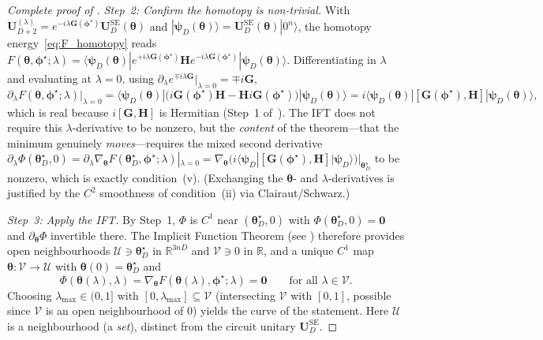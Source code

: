 \documentclass[11pt]{article}
\newcommand{\cU}{\mathcal{U}}
\newcommand{\cV}{\mathcal{V}}
\newcommand{\bbR}{\mathbb{R}}
\theoremstyle{plain}
\theoremstyle{plain}
\begin{document}
\begin{proof}[Complete proof of ]
\emph{Step~2: Confirm the homotopy is non-trivial.}
With $\mathbf{U}_{D+2}^{(\lambda)}=e^{-i\lambda\mathbf{G}(\bm\phi^\star)}
\mathbf{U}_D^{\mathrm{SE}}(\bm\theta)$ and
$|\boldsymbol{\psi}_D(\bm\theta)\rangle=\mathbf{U}_D^{\mathrm{SE}}(\bm\theta)|0^n\rangle$,
the homotopy energy~\eqref{eq:F_homotopy} reads
$F(\bm\theta,\bm\phi^\star;\lambda)
=\langle\boldsymbol{\psi}_D(\bm\theta)| 
e^{+i\lambda\mathbf{G}(\bm\phi^\star)}\mathbf{H} e^{-i\lambda\mathbf{G}(\bm\phi^\star)} 
|\boldsymbol{\psi}_D(\bm\theta)\rangle$.
Differentiating in $\lambda$ and evaluating at $\lambda=0$, using
$\partial_\lambda e^{\mp i\lambda\mathbf{G}}|_{\lambda=0}=\mp i\mathbf{G}$,
\begin{equation}\label{eq:lambda_deriv_app}
  \partial_\lambda F(\bm\theta,\bm\phi^\star;\lambda)\big|_{\lambda=0}
  =\langle\boldsymbol{\psi}_D(\bm\theta)|
    \bigl(i\mathbf{G}(\bm\phi^\star)\mathbf{H}-\mathbf{H} i\mathbf{G}(\bm\phi^\star)\bigr)
    |\boldsymbol{\psi}_D(\bm\theta)\rangle
  =i\langle\boldsymbol{\psi}_D(\bm\theta)|[\mathbf{G}(\bm\phi^\star),\mathbf{H}]|\boldsymbol{\psi}_D(\bm\theta)\rangle,
\end{equation}
which is real because $i[\mathbf{G},\mathbf{H}]$ is Hermitian (Step~1
of~).  The IFT does not require this $\lambda$-derivative
to be nonzero, but the \emph{content} of the theorem---that the minimum
genuinely \emph{moves}---requires the mixed second derivative
$\partial_\lambda\Phi(\bm\theta_D^\star,0)
=\partial_\lambda\nabla_{\bm\theta}F(\bm\theta_D^\star,\bm\phi^\star;\lambda)|_{\lambda=0}
=\nabla_{\bm\theta}\bigl(i\langle\boldsymbol{\psi}_D|[\mathbf{G}(\bm\phi^\star),\mathbf{H}]
|\boldsymbol{\psi}_D\rangle\bigr)\big|_{\bm\theta_D^\star}$
to be nonzero, which is exactly condition~(v).  (Exchanging the
$\bm\theta$- and $\lambda$-derivatives is justified by the
$C^2$ smoothness of condition~(ii) via Clairaut/Schwarz.)

\emph{Step~3: Apply the IFT.}
By Step~1, $\Phi$ is $C^1$ near $(\bm\theta_D^\star,0)$ with
$\Phi(\bm\theta_D^\star,0)=\bm0$ and $\partial_{\bm\theta}\Phi$
invertible there.  The Implicit Function Theorem
(see \cite[Theorem~1.3.1]{allgower2003introduction}) therefore provides
open neighbourhoods $\cU\ni\bm\theta_D^\star$ in $\bbR^{3nD}$ and
$\cV\ni 0$ in $\bbR$, and a unique $C^1$ map $\bm\theta:\cV\to\cU$ with
$\bm\theta(0)=\bm\theta_D^\star$ and
\begin{equation}\label{eq:ift_root_app}
  \Phi(\bm\theta(\lambda),\lambda)
  =\nabla_{\bm\theta}F(\bm\theta(\lambda),\bm\phi^\star;\lambda)=\bm0
  \qquad\text{for all }\lambda\in\cV.
\end{equation}
Choosing $\lambda_{\max}\in(0,1]$ with $[0,\lambda_{\max}]\subseteq\cV$
(intersecting $\cV$ with $[0,1]$, possible since $\cV$ is an open
neighbourhood of $0$) yields the curve of the statement.  Here $\cU$ is
a neighbourhood (a \emph{set}), distinct from the circuit unitary
$\mathbf{U}_D^{\mathrm{SE}}$.


\end{proof}
\end{document}

